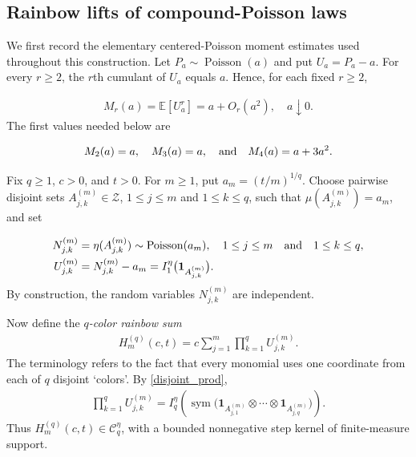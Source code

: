 \documentclass[letterpaper,11pt,reqno]{amsart}
\numberwithin{equation}{section}
\theoremstyle{plain}
\theoremstyle{definition}
\theoremstyle{remark}
\newcommand{\E}{\mathbb{E}}
\newcommand{\ind}{\mathbf{1}}
\newcommand{\cC}{\mathcal{C}}
\newcommand{\sZ}{\mathscr{Z}}
\DeclareMathOperator{\sym}{sym}
\DeclareMathOperator{\Pois}{Poisson}
\newcommand{\noi}{\noindent}
\newcommand{\ot}{\otimes}
\newcommand{\AND}{\quad{\rm and}\quad}
\begin{document}
\subsection{Rainbow lifts of compound-Poisson laws}
\label{SEC_35}

We first record the elementary centered-Poisson moment estimates used
throughout this construction.  Let $P_a\sim\Pois(a)$ and put
$U_a=P_a-a$.  For every $r\geq2$, the $r$th cumulant of $U_a$ equals
$a$.  Hence, for each fixed $r\geq2$,

\noi
\begin{align}
 M_r(a)=\E[U_a^r]
 =a+O_r(a^2),
 \quad a\downarrow0.
 \label{Poi_mom}
\end{align}
The first values needed below are

\noi
\begin{align*}
 M_2(a)=a,
 \quad
 M_3(a)=a,
 \AND
 M_4(a)=a+3a^2.
\end{align*}

Fix $q\geq1$, $c>0$, and $t>0$.  For $m\geq1$, put
$ a_m=\left( t/m\right)^{1/q}$.
Choose pairwise disjoint sets $A_{j,k}^{(m)}\in\sZ$,
$1\leq j\leq m$ and $1\leq k\leq q$, such that
$ \mu(A_{j,k}^{(m)})=a_m$,
and set

\noi
\begin{align*}
 N_{j,k}^{(m)}
 &=\eta(A_{j,k}^{(m)})
 \sim\Pois(a_m),
 \quad
 1\leq j\leq m\AND 1\leq k\leq q,\\
 U_{j,k}^{(m)}
 &=N_{j,k}^{(m)}-a_m
 =I_1^\eta\bigl(\ind_{A_{j,k}^{(m)}}\bigr).
\end{align*}
By construction,
the random variables $N_{j,k}^{(m)}$ are independent.

Now define the \textit{$q$-color rainbow sum}
\noi
\begin{align}
 H_m^{(q)}(c,t)
 =c\sum_{j=1}^m
 \prod_{k=1}^qU_{j,k}^{(m)}.
 \label{rainbow_def}
\end{align}
The terminology refers to the fact that every monomial uses one
coordinate from each of $q$ disjoint `colors'.  By \eqref{disjoint_prod},
\noi
\begin{align*}
 \prod_{k=1}^qU_{j,k}^{(m)}
 =I_q^\eta\left(
 \sym\bigl(
 \ind_{A_{j,1}^{(m)}}\ot\cdots\ot
 \ind_{A_{j,q}^{(m)}}
 \bigr)
 \right).
\end{align*}
Thus $H_m^{(q)}(c,t)\in\cC_q^\eta$, with a bounded nonnegative step kernel
of finite-measure support.
\end{document}
